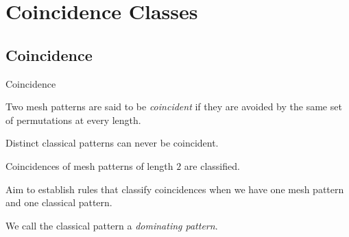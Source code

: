 \section{Coincidence Classes}
\label{sec:Coincidence Classes}
\subsection{Coincidence}
\label{sub:Coincidence}
\begin{frame}{Coincidence}
  \begin{definition}
    Two mesh patterns are said to be \emph{coincident} if they are avoided by the
    same set of permutations at every length.
  \end{definition}
  \begin{block}{}
    Distinct classical patterns can never be coincident.

    Coincidences of mesh patterns of length \(2\) are classified.

    Aim to establish rules that classify coincidences when we
    have one mesh pattern and one classical pattern.

    We call the classical pattern a \emph{dominating pattern}.
  \end{block}
\end{frame}

